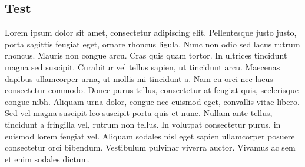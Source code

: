 \documentclass[letterpaper, twoside, 12pt,these,creativecommons,hyperref]{thETS}
\begin{document}
\subsection{Test}


Lorem ipsum dolor sit amet, consectetur adipiscing elit. Pellentesque justo justo, porta sagittis feugiat eget, ornare rhoncus ligula. Nunc non odio sed lacus rutrum rhoncus. Mauris non congue arcu. Cras quis quam tortor. In ultrices tincidunt magna sed suscipit. Curabitur vel tellus sapien, ut tincidunt arcu. Maecenas dapibus ullamcorper urna, ut mollis mi tincidunt a. Nam eu orci nec lacus consectetur commodo. Donec purus tellus, consectetur at feugiat quis, scelerisque congue nibh. Aliquam urna dolor, congue nec euismod eget, convallis vitae libero. Sed vel magna suscipit leo suscipit porta quis et nunc. Nullam ante tellus, tincidunt a fringilla vel, rutrum non tellus. In volutpat consectetur purus, in euismod lorem feugiat vel. Aliquam sodales nisl eget sapien ullamcorper posuere consectetur orci bibendum. Vestibulum pulvinar viverra auctor. Vivamus ac sem et enim sodales dictum.

 


%


\singlespacing
\onehalfspacing



\newpage
\singlespacing

\onehalfspacing
\end{document}
